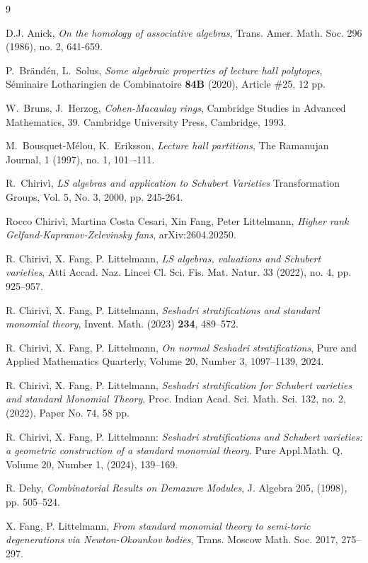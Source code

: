 \documentclass[12pt, a4paper]{amsart}   	%
\numberwithin{equation}{section}
\theoremstyle{plain}
\theoremstyle{definition}
\begin{document}
\begin{thebibliography}{9}

 D.J. Anick, \emph{On the homology of associative algebras}, Trans. Amer. Math. Soc. 296 (1986), no. 2, 641-659.

 P.~Brändén, L.~Solus, \emph{Some algebraic properties of lecture hall polytopes}, Séminaire Lotharingien de Combinatoire \textbf{84B} (2020), Article \#25, 12 pp.

 W.~Bruns, J.~Herzog, \emph{Cohen-Macaulay rings}, Cambridge Studies in Advanced Mathematics, 39. Cambridge University Press, Cambridge, 1993.

M.~Bousquet-Mélou, K.~Eriksson, \emph{Lecture hall partitions}, The Ramanujan Journal, 1 (1997), no. 1, 101–-111. 

 R.~Chiriv{\`i}, \emph{LS algebras and application to Schubert Varieties} Transformation Groups, Vol. 5, No. 3, 2000, pp. 245-264.

Rocco Chiriv\`{i}, Martina Costa Cesari, Xin Fang, Peter Littelmann,
\emph{Higher rank Gelfand-Kapranov-Zelevinsky fans}, arXiv:2604.20250.

R. Chiriv\`i, X. Fang, P. Littelmann, 
\emph{LS algebras, valuations and Schubert varieties}, Atti Accad. Naz. Lincei Cl. Sci. Fis. Mat. Natur. 33 (2022), no. 4, pp. 925--957.

R. Chiriv\`i, X. Fang, P. Littelmann, 
\emph{Seshadri stratifications and standard monomial theory}, 
Invent. Math. (2023) {\bf 234}, 489--572.

R. Chiriv\`i, X. Fang, P. Littelmann,
\emph{On normal Seshadri stratifications}, Pure and Applied Mathematics Quarterly, Volume 20, Number 3, 1097--1139, 2024.

R. Chiriv\`i, X. Fang, P. Littelmann, 
\emph{Seshadri stratification for Schubert varieties and standard Monomial Theory}, 
Proc. Indian Acad. Sci. Math. Sci. 132, no. 2, (2022), Paper No. 74, 58 pp.

R. Chirivì, X. Fang, P. Littelmann: \emph{Seshadri stratifications and Schubert varieties: a geometric construction
of a standard monomial theory}. Pure Appl.Math. Q. Volume 20, Number 1, (2024), 139--169. 

R. Dehy, \emph{Combinatorial Results on Demazure Modules}, J. Algebra 205, (1998), pp. 505--524.

X. Fang, P. Littelmann, \emph{From standard monomial theory to semi-toric degenerations via Newton-Okounkov bodies}, Trans. Moscow Math. Soc. 2017, 275--297.


\end{thebibliography}
\end{document}
